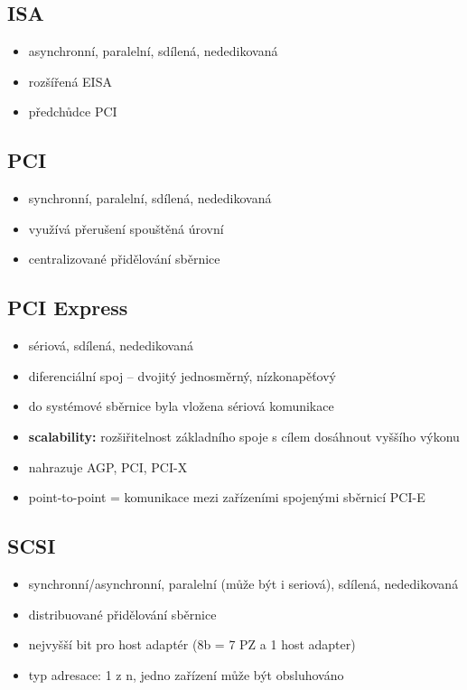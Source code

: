 \documentclass[a5paper,10pt]{article}
\begin{document}
\subsection{ISA}
\begin{itemize}
	\item asynchronní, paralelní, sdílená, nededikovaná
	\item rozšířená EISA
	\item předchůdce PCI	
\end{itemize}

\subsection{PCI}
\begin{itemize}
	\item synchronní, paralelní, sdílená, nededikovaná
	\item využívá přerušení spouštěná úrovní
	\item centralizované přidělování sběrnice
\end{itemize}

\subsection{PCI Express}
\begin{itemize}
	\item sériová, sdílená, nededikovaná	
	\item diferenciální spoj -- dvojitý jednosměrný, nízkonapěťový
	\item do systémové sběrnice byla vložena sériová komunikace
	\item \textbf{scalability:} rozšiřitelnost základního spoje s cílem dosáhnout vyššího výkonu
	\item nahrazuje AGP, PCI, PCI-X
	\item point-to-point = komunikace mezi zařízeními spojenými sběrnicí PCI-E
\end{itemize}

\subsection{SCSI}
\begin{itemize}
	\item synchronní/asynchronní, paralelní (může být i seriová), sdílená, nededikovaná
	\item distribuované přidělování sběrnice
	\item nejvyšší bit pro host adaptér (8b = 7 PZ a 1 host adapter)
	\item typ adresace: 1 z n, jedno zařízení může být obsluhováno
\end{itemize}
\end{document}
